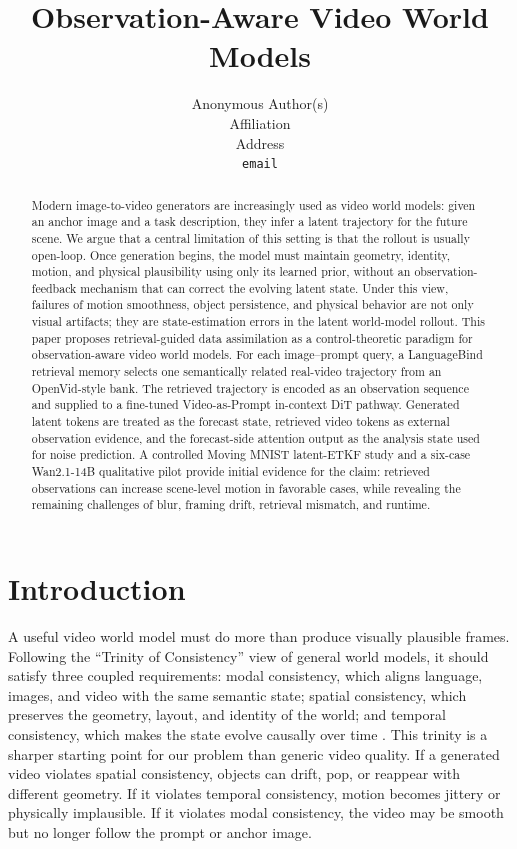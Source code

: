 \documentclass{article}
\title{Observation-Aware Video World Models}
\author{
Anonymous Author(s)\\
Affiliation\\
Address\\
\texttt{email}
}
\begin{document}
\maketitle

\begin{abstract}
Modern image-to-video generators are increasingly used as video world models: given an anchor image and a task description, they infer a latent trajectory for the future scene. We argue that a central limitation of this setting is that the rollout is usually open-loop. Once generation begins, the model must maintain geometry, identity, motion, and physical plausibility using only its learned prior, without an observation-feedback mechanism that can correct the evolving latent state. Under this view, failures of motion smoothness, object persistence, and physical behavior are not only visual artifacts; they are state-estimation errors in the latent world-model rollout. This paper proposes retrieval-guided data assimilation as a control-theoretic paradigm for observation-aware video world models. For each image--prompt query, a LanguageBind retrieval memory selects one semantically related real-video trajectory from an OpenVid-style bank. The retrieved trajectory is encoded as an observation sequence and supplied to a fine-tuned Video-as-Prompt in-context DiT pathway. Generated latent tokens are treated as the forecast state, retrieved video tokens as external observation evidence, and the forecast-side attention output as the analysis state used for noise prediction. A controlled Moving MNIST latent-ETKF study and a six-case Wan2.1-14B qualitative pilot provide initial evidence for the claim: retrieved observations can increase scene-level motion in favorable cases, while revealing the remaining challenges of blur, framing drift, retrieval mismatch, and runtime.
\end{abstract}

\section{Introduction}

A useful video world model must do more than produce visually plausible frames. Following the ``Trinity of Consistency'' view of general world models, it should satisfy three coupled requirements: modal consistency, which aligns language, images, and video with the same semantic state; spatial consistency, which preserves the geometry, layout, and identity of the world; and temporal consistency, which makes the state evolve causally over time \citep{trinityconsistency2026}. This trinity is a sharper starting point for our problem than generic video quality. If a generated video violates spatial consistency, objects can drift, pop, or reappear with different geometry. If it violates temporal consistency, motion becomes jittery or physically implausible. If it violates modal consistency, the video may be smooth but no longer follow the prompt or anchor image.
\end{document}
